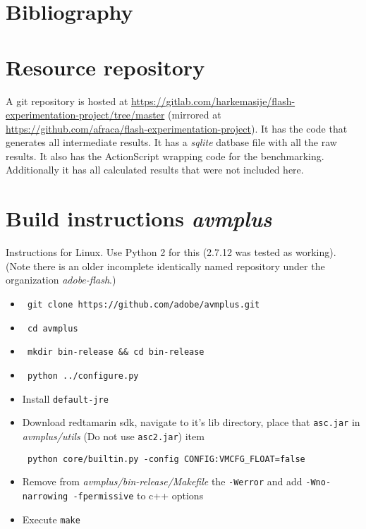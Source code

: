 \documentclass[a4paper,11pt]{scrartcl}
\begin{document}
\newpage

\section{Bibliography}



\appendix

\section{Resource repository}
\label{sec:resources}

A git repository is hosted at \url{https://gitlab.com/harkemasije/flash-experimentation-project/tree/master} (mirrored at \url{https://github.com/afraca/flash-experimentation-project}). It has the code that generates all intermediate results. It has a \textit{sqlite} datbase file with all the raw results. It also has the ActionScript wrapping code for the benchmarking. Additionally it has all calculated results that were not included here.


\section{Build instructions \textit{avmplus}}
\label{sec:buildavmplus}

Instructions for Linux. Use Python 2 for this (2.7.12 was tested as working). (Note there is an older incomplete identically named repository under the organization \textit{adobe-flash}.)

\begin{itemize}
\item \begin{verbatim} git clone https://github.com/adobe/avmplus.git \end{verbatim} 
\item \begin{verbatim} cd avmplus \end{verbatim}
\item \begin{verbatim} mkdir bin-release && cd bin-release \end{verbatim}
\item \begin{verbatim} python ../configure.py \end{verbatim}
\item Install \texttt{default-jre} 
\item Download redtamarin sdk, navigate to it's lib directory, place that \texttt{asc.jar} in \textit{avmplus/utils} (Do not use \texttt{asc2.jar})
item \begin{verbatim} python core/builtin.py -config CONFIG:VMCFG_FLOAT=false \end{verbatim}
\item Remove from \textit{avmplus/bin-release/Makefile} the \texttt{-Werror} and add \texttt{-Wno-narrowing -fpermissive} to c++ options
\item Execute \texttt{make}
\end{itemize}
\end{document}
